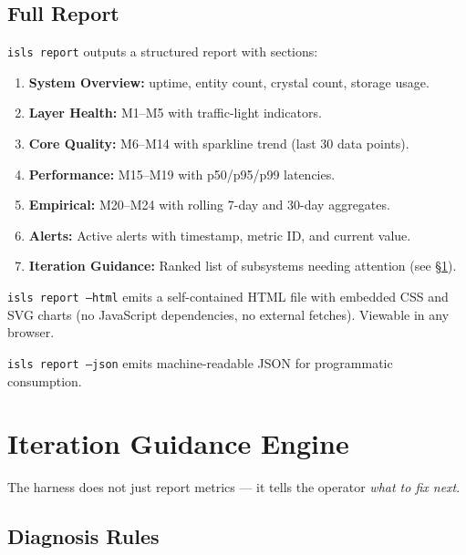 \documentclass[10pt,a4paper]{article}
\begin{document}
\subsection{Full Report}

\texttt{isls report} outputs a structured report with sections:

\begin{enumerate}[nosep]
\item \textbf{System Overview:} uptime, entity count, crystal count, storage usage.
\item \textbf{Layer Health:} M1--M5 with traffic-light indicators.
\item \textbf{Core Quality:} M6--M14 with sparkline trend (last 30 data points).
\item \textbf{Performance:} M15--M19 with p50/p95/p99 latencies.
\item \textbf{Empirical:} M20--M24 with rolling 7-day and 30-day aggregates.
\item \textbf{Alerts:} Active alerts with timestamp, metric ID, and current value.
\item \textbf{Iteration Guidance:} Ranked list of subsystems needing attention (see \S\ref{sec:iteration}).
\end{enumerate}

\texttt{isls report --html} emits a self-contained HTML file with embedded CSS and SVG charts (no JavaScript dependencies, no external fetches). Viewable in any browser.

\texttt{isls report --json} emits machine-readable JSON for programmatic consumption.

\section{Iteration Guidance Engine}
\label{sec:iteration}

The harness does not just report metrics --- it tells the operator \emph{what to fix next}.

\subsection{Diagnosis Rules}
\end{document}
